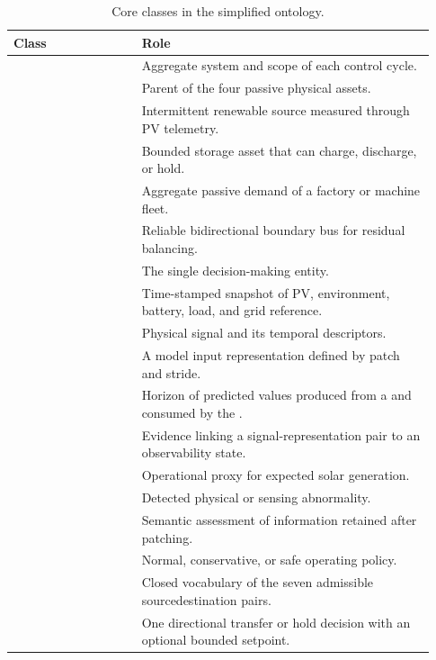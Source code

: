 \begin{table}[!tbp]
\centering
\small
\begin{tabular}{@{}M{0.29\linewidth}M{0.64\linewidth}@{}}
\toprule
\textbf{Class} & \textbf{Role} \\
\midrule
{} & Aggregate system and scope of each control cycle. \\
\rowsep%
 & Parent of the four passive physical assets. \\
\rowsep%
 & Intermittent renewable source measured through PV telemetry. \\
\rowsep%
 & Bounded storage asset that can charge, discharge, or hold. \\
\rowsep%
 & Aggregate passive demand of a factory or machine fleet. \\
\rowsep%
 & Reliable bidirectional boundary bus for residual balancing. \\
\midrule
{} & The single decision-making entity. \\
\rowsep%
 & Time-stamped snapshot of PV, environment, battery, load, and grid reference. \\
\midrule
{} & Physical signal and its temporal descriptors. \\
\rowsep%
 & A model input representation defined by patch and stride. \\
\rowsep%
 & Horizon of predicted values produced from a  and consumed by the . \\
\rowsep%
 & Evidence linking a signal-representation pair to an observability state. \\
\midrule
{} & Operational proxy for expected solar generation. \\
\rowsep%
 & Detected physical or sensing abnormality. \\
\rowsep%
 & Semantic assessment of information retained after patching. \\
\rowsep%
 & Normal, conservative, or safe operating policy. \\
\rowsep%
 & Closed vocabulary of the seven admissible source\textendash{}destination pairs. \\
\midrule
{} & One directional transfer or hold decision with an optional bounded setpoint. \\
\bottomrule
\end{tabular}
\caption{Core classes in the simplified ontology.}%
\label{tab:classes}
\end{table}
